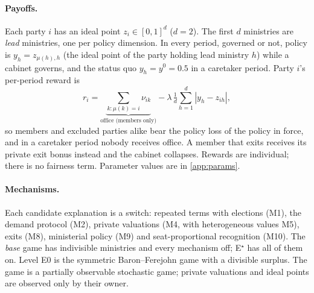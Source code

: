 \documentclass[11pt,a4paper]{article}
\begin{document}
\paragraph{Payoffs.} Each party $i$ has an ideal point $z_i\in[0,1]^d$ ($d=2$). The first $d$
ministries are \emph{lead} ministries, one per policy dimension. In every period, governed or not, policy
is $y_h=z_{\mu(h),h}$ (the ideal point of the party holding lead ministry $h$) while a cabinet governs,
and the status quo $y_h=y^0=0.5$ in a caretaker period. Party $i$'s per-period reward is
\begin{equation}\label{eq:reward}
r_i=\underbrace{\textstyle\sum_{k:\mu(k)=i}\nu_{ik}}_{\text{office (members only)}}
-\lambda\,\tfrac1d\textstyle\sum_{h=1}^d|y_h-z_{ih}|,
\end{equation}
so members and excluded parties alike bear the policy loss of the policy in force, and in a caretaker
period nobody receives office. A member that exits receives its private exit bonus instead and the cabinet
collapses. Rewards are individual; there is no fairness term. Parameter values are in \cref{app:params}.

\paragraph{Mechanisms.} Each candidate explanation is a switch: repeated terms with elections (M1),
the demand protocol (M2), private valuations (M4, with heterogeneous values M5), exits (M8), ministerial
policy (M9) and seat-proportional recognition (M10). The \emph{base} game has indivisible ministries and
every mechanism off; E$^\star$ has all of them on. Level E0 is the symmetric Baron--Ferejohn game with a
divisible surplus. The game is a partially observable stochastic game; private valuations and ideal
points are observed only by their owner.
\end{document}
